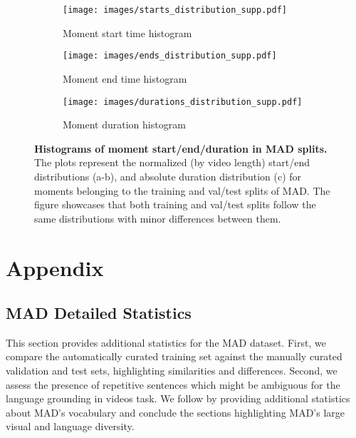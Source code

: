 \documentclass[10pt,twocolumn,letterpaper]{article}
\begin{document}
\begin{multicols}{2}
\begin{figure*}[!b]
    \centering
    \begin{subfigure}[t]{0.335\linewidth}
        \centering
        \texttt{[image: images/starts\_distribution\_supp.pdf]}
        \caption{Moment start time histogram}
        \label{fig:starts-sup}
    \end{subfigure}\begin{subfigure}[t]{0.322\linewidth}
        \centering
        \texttt{[image: images/ends\_distribution\_supp.pdf]}
        \caption{Moment end time histogram}
        \label{fig:ends-sup}
    \end{subfigure}\begin{subfigure}[t]{0.33\linewidth}
        \centering
        \texttt{[image: images/durations\_distribution\_supp.pdf]}
        \caption{Moment duration histogram}
        \label{fig:durations-sup}
    \end{subfigure}
    \caption{\textbf{Histograms of moment start/end/duration in MAD splits.} The plots represent the normalized (by video length) start/end distributions (a-b), and absolute duration distribution (c) for moments belonging to the training and val/test splits of MAD. The figure showcases that both training and val/test splits follow the same distributions with minor differences between them. 
    }
    \label{fig:dataset-attributes-sup}
\end{figure*}
 \end{multicols}

\newpage
\appendix
\section{Appendix}

\subsection{MAD Detailed Statistics}
This section provides additional statistics for the MAD dataset. First, we compare the automatically curated training set against the manually curated validation and test sets, highlighting similarities and differences. Second, we assess the presence of repetitive sentences which might be ambiguous for the language grounding in videos task. We follow by providing additional statistics about MAD's vocabulary and conclude the sections highlighting MAD's large visual and language diversity. 
\end{document}

